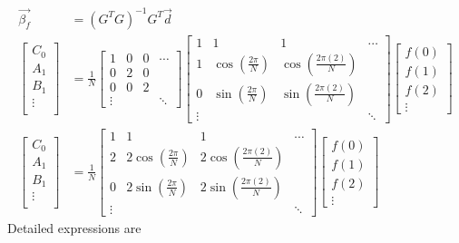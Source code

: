 \begin{align}
\vec{\beta_f} &= (G^TG)^{-1}G^T\vec{d} \nonumber \\
\begin{bmatrix}
C_0 \\
A_1 \\
B_1 \\
\vdots \\
\end{bmatrix}
&= \frac{1}{N} 
\begin{bmatrix}
1 & 0 & 0 & \cdots \\
0 & 2 & 0 & \\
0 & 0 & 2 & \\
\vdots & & & \ddots
\end{bmatrix} 
\begin{bmatrix}
1 & 1 & 1 & \cdots \\
1 & \cos(\frac{2\pi}{N}) & \cos(\frac{2\pi(2)}{N}) & \\
0 & \sin(\frac{2\pi}{N}) & \sin(\frac{2\pi(2)}{N}) & \\
\vdots & & & \ddots
\end{bmatrix}
\begin{bmatrix}
f(0)\\
f(1)\\
f(2)\\
\vdots
\end{bmatrix} \nonumber \\
\begin{bmatrix}
C_0 \\
A_1 \\
B_1 \\
\vdots \\
\end{bmatrix}
&= 
\frac{1}{N}
\begin{bmatrix}
1 & 1 & 1 & \cdots \\
2 & 2\cos(\frac{2\pi}{N}) & 2\cos(\frac{2\pi(2)}{N}) & \\
0 & 2\sin(\frac{2\pi}{N}) & 2\sin(\frac{2\pi(2)}{N}) & \\
\vdots & & & \ddots
\end{bmatrix}
\begin{bmatrix}
f(0)\\
f(1)\\
f(2)\\
\vdots
\end{bmatrix} 
\end{align}
Detailed expressions are

